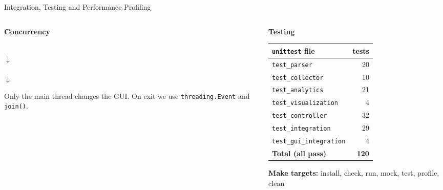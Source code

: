 \documentclass[aspectratio=169,10pt]{beamer}
\begin{document}
\begin{frame}{Integration, Testing and Performance Profiling}
\begin{columns}[T]

\begin{column}{0.30\textwidth}
\textbf{Concurrency}
\scriptsize

\vspace{0.1cm}
\\
\centering $\downarrow$\\
\\
$\downarrow$\\

\raggedright
\vspace{0.2cm}
Only the main thread changes the GUI. On exit we use \texttt{threading.Event} and \texttt{join()}.
\end{column}

\begin{column}{0.28\textwidth}
\textbf{Testing}
\scriptsize

\vspace{0.1cm}
\begin{tabular}{lr}
\toprule
\texttt{unittest} file & tests \\
\midrule
\texttt{test\_parser} & 20 \\
\texttt{test\_collector} & 10 \\
\texttt{test\_analytics} & 21 \\
\texttt{test\_visualization} & 4 \\
\texttt{test\_controller} & 32 \\
\texttt{test\_integration} & 29 \\
\texttt{test\_gui\_integration} & 4 \\
\midrule
\textbf{Total (all pass)} & \textbf{120} \\
\bottomrule
\end{tabular}

\vspace{0.2cm}
\textbf{Make targets:} install, check, run, mock, test, profile, clean
\end{column}


\end{columns}
\end{frame}
\end{document}
